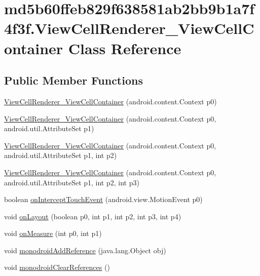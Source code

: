 \hypertarget{classmd5b60ffeb829f638581ab2bb9b1a7f4f3f_1_1_view_cell_renderer___view_cell_container}{
\section{md5b60ffeb829f638581ab2bb9b1a7f4f3f.ViewCellRenderer\_\-ViewCellContainer Class Reference}
\label{classmd5b60ffeb829f638581ab2bb9b1a7f4f3f_1_1_view_cell_renderer___view_cell_container}
}
\subsection*{Public Member Functions}
\begin{CompactItemize}
\item 
\hyperlink{classmd5b60ffeb829f638581ab2bb9b1a7f4f3f_1_1_view_cell_renderer___view_cell_container_2573ac4de7f2671992a9bfa260bc4fe1}{ViewCellRenderer\_\-ViewCellContainer} (android.content.Context p0)
\item 
\hyperlink{classmd5b60ffeb829f638581ab2bb9b1a7f4f3f_1_1_view_cell_renderer___view_cell_container_ba0f4072dbb2ab5be4a473be900ab2b7}{ViewCellRenderer\_\-ViewCellContainer} (android.content.Context p0, android.util.AttributeSet p1)
\item 
\hyperlink{classmd5b60ffeb829f638581ab2bb9b1a7f4f3f_1_1_view_cell_renderer___view_cell_container_ca3e2863fea87a844ab7185a603c7e3c}{ViewCellRenderer\_\-ViewCellContainer} (android.content.Context p0, android.util.AttributeSet p1, int p2)
\item 
\hyperlink{classmd5b60ffeb829f638581ab2bb9b1a7f4f3f_1_1_view_cell_renderer___view_cell_container_4760e07b60b324dc64a274ef17c71f4c}{ViewCellRenderer\_\-ViewCellContainer} (android.content.Context p0, android.util.AttributeSet p1, int p2, int p3)
\item 
boolean \hyperlink{classmd5b60ffeb829f638581ab2bb9b1a7f4f3f_1_1_view_cell_renderer___view_cell_container_da3c5da37f05ad33b1f3e2af8acb10d1}{onInterceptTouchEvent} (android.view.MotionEvent p0)
\item 
void \hyperlink{classmd5b60ffeb829f638581ab2bb9b1a7f4f3f_1_1_view_cell_renderer___view_cell_container_980c2a52c9437398d570f602256c9687}{onLayout} (boolean p0, int p1, int p2, int p3, int p4)
\item 
void \hyperlink{classmd5b60ffeb829f638581ab2bb9b1a7f4f3f_1_1_view_cell_renderer___view_cell_container_43bfa04d9cf8132c9b32c3ae7937f7ac}{onMeasure} (int p0, int p1)
\item 
void \hyperlink{classmd5b60ffeb829f638581ab2bb9b1a7f4f3f_1_1_view_cell_renderer___view_cell_container_bc30d10082a2bb9158e2576a2956d9b8}{monodroidAddReference} (java.lang.Object obj)
\item 
void \hyperlink{classmd5b60ffeb829f638581ab2bb9b1a7f4f3f_1_1_view_cell_renderer___view_cell_container_ae9ff83f231b0621942b6490e9b805d8}{monodroidClearReferences} ()
\end{CompactItemize}
